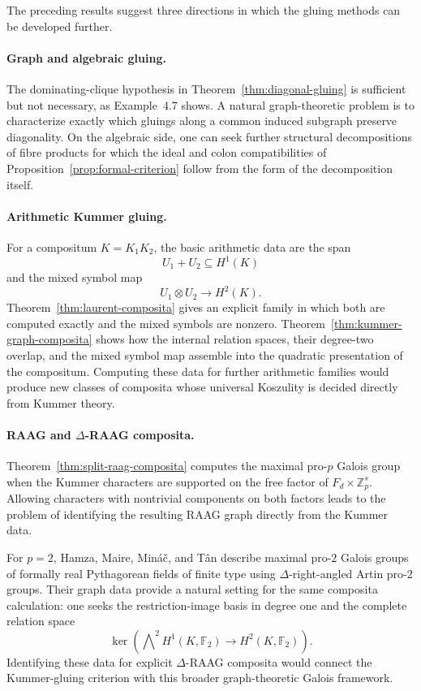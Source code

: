 \documentclass[12pt]{amsart}
\theoremstyle{plain}
\theoremstyle{definition}
\theoremstyle{remark}
\numberwithin{equation}{section}
\newcommand{\Ftwo}{\mathbb{F}_2}
\begin{document}
The preceding results suggest three directions in which the gluing methods can
be developed further.

\paragraph{Graph and algebraic gluing.}
The dominating-clique hypothesis in
Theorem~\ref{thm:diagonal-gluing} is sufficient but not necessary, as
Example~4.7 shows. A natural graph-theoretic problem is to characterize
exactly which gluings along a common induced subgraph preserve diagonality.
On the algebraic side, one can seek further structural decompositions of
fibre products for which the ideal and colon compatibilities of
Proposition~\ref{prop:formal-criterion} follow from the form of the
decomposition itself.

\paragraph{Arithmetic Kummer gluing.}
For a compositum \(K=K_1K_2\), the basic arithmetic data are the span
\[
U_1+U_2\subseteq H^1(K)
\]
and the mixed symbol map
\[
U_1\otimes U_2\longrightarrow H^2(K).
\]
Theorem~\ref{thm:laurent-composita} gives an explicit family in which both
are computed exactly and the mixed symbols are nonzero.
Theorem~\ref{thm:kummer-graph-composita} shows how the internal relation
spaces, their degree-two overlap, and the mixed symbol map assemble into the
quadratic presentation of the compositum. Computing these data for further
arithmetic families would produce new classes of composita whose universal
Koszulity is decided directly from Kummer theory.

\paragraph{RAAG and \(\Delta\)-RAAG composita.}
Theorem~\ref{thm:split-raag-composita} computes the maximal pro-\(p\) Galois
group when the Kummer characters are supported on the free factor of
\(F_d\times\mathbb Z_p^s\). Allowing characters with nontrivial components
on both factors leads to the problem of identifying the resulting RAAG graph
directly from the Kummer data.

For \(p=2\), Hamza, Maire, Min\'{a}\v{c}, and T\^{a}n
\cite{HamzaMaireMinacTan} describe maximal pro-\(2\) Galois groups of
formally real Pythagorean fields of finite type using
\(\Delta\)-right-angled Artin pro-\(2\) groups. Their graph data provide a
natural setting for the same composita calculation: one seeks the
restriction-image basis in degree one and the complete relation space
\[
\ker\left(\bigwedge\nolimits^2H^1(K,\Ftwo)\longrightarrow H^2(K,\Ftwo)\right).
\]
Identifying these data for explicit \(\Delta\)-RAAG composita would connect
the Kummer-gluing criterion with this broader graph-theoretic Galois
framework.
\end{document}
